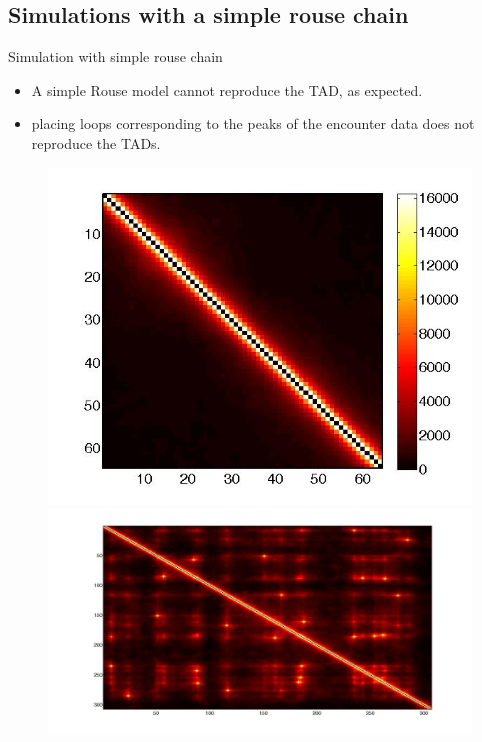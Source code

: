 \documentclass[8pt]{beamer}
\begin{document}
\subsection{Simulations with a simple rouse chain}
\begin{frame}{Simulation with simple rouse chain}
\begin{itemize}
\item A simple Rouse model cannot reproduce the TAD, as expected.
\item placing loops corresponding to the peaks of the encounter data does not reproduce the TADs. 
\end{itemize}
\begin{figure}[H]
\includegraphics[scale=0.17]{encounterMatrix64Beads}
\includegraphics[scale=0.09]{meanEncounterMatrixOfSimulatingTADEandDWithLoops}
\end{figure}
\end{frame}
\end{document}
